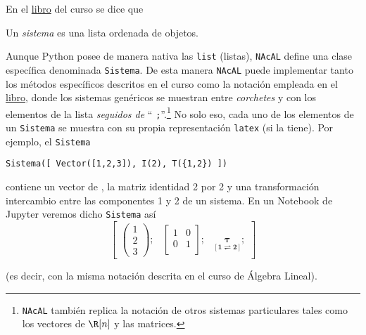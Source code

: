 \documentclass[11pt]{report}
\begin{document}
En el \href{https://mbujosab.github.io/CursoDeAlgebraLineal/libro.pdf\#chapter.1}{libro} del curso se dice que
\begin{center}
  Un \emph{sistema} es una lista ordenada de objetos.
\end{center}
Aunque Python posee de manera nativa las \texttt{list} (listas), \texttt{NAcAL} define una clase específica
denominada \texttt{Sistema}. De esta manera \texttt{NAcAL} puede implementar tanto los métodos específicos
descritos en el curso como la notación empleada en el \href{https://mbujosab.github.io/CursoDeAlgebraLineal/libro.pdf\#chapter.1}{libro}, donde los sistemas genéricos se
muestran entre \emph{corchetes} y con los elementos de la lista \emph{seguidos de} `` \texttt{;}''.\footnote{\texttt{NAcAL}
también replica la notación de otros sistemas particulares tales como los vectores de \(\R[n]\) y las
matrices.} No solo eso, cada uno de los elementos de un \texttt{Sistema} se muestra con su propia
representación \texttt{latex} (si la tiene). Por ejemplo, el \texttt{Sistema}
\begin{verbatim}
Sistema([ Vector([1,2,3]), I(2), T({1,2}) ]) 
\end{verbatim}
contiene un vector de \R[3], la matriz identidad 2 por 2 y una transformación intercambio entre las
componentes 1 y 2 de un sistema. En un Notebook de Jupyter veremos dicho \texttt{Sistema} así
$$\begin{bmatrix}\begin{pmatrix}1\\ 2\\ 3\end{pmatrix};& \left[ \begin{array}{cc}1&0\\0&1\\ \end{array} \right];& \underset{\left[\mathbf{1}\rightleftharpoons\mathbf{2}\right]}{\pmb{\tau}};\end{bmatrix}$$

\noindent
(es decir, con la misma notación descrita en el curso de Álgebra Lineal).
\end{document}
